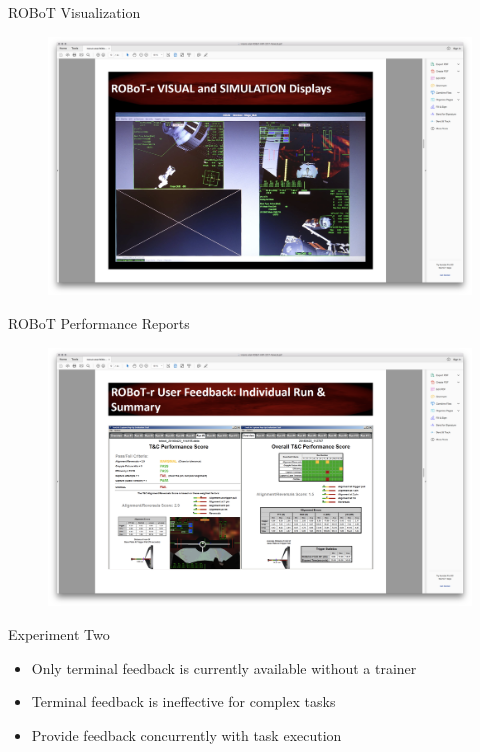 \documentclass[10pt]{beamer}
\begin{document}
\begin{frame}[fragile]{ROBoT Visualization}
\begin{figure}
  \begin{center}
    \includegraphics[trim={13cm 5cm 22cm 15.5cm},clip,width=\linewidth]{../img/Screen_Shot_2018-07-26_at_1.43.02_PM.png}
  \end{center}
\end{figure}
\end{frame}

\begin{frame}[fragile]{ROBoT Performance Reports}
\begin{figure}
  \begin{center}
    \includegraphics[trim={13cm 5cm 22cm 15.5cm},clip,width=\linewidth]{../img/Screen_Shot_2018-07-26_at_1.43.07_PM.png}
  \end{center}
\end{figure}
\end{frame}

\begin{frame}[fragile]{Experiment Two}
  \begin{itemize}
    \setlength\itemsep{1em}
    \item Only terminal feedback is currently available without a trainer
    \item Terminal feedback is ineffective for complex tasks
    \item Provide feedback concurrently with task execution
  \end{itemize}
\end{frame}
\end{document}
